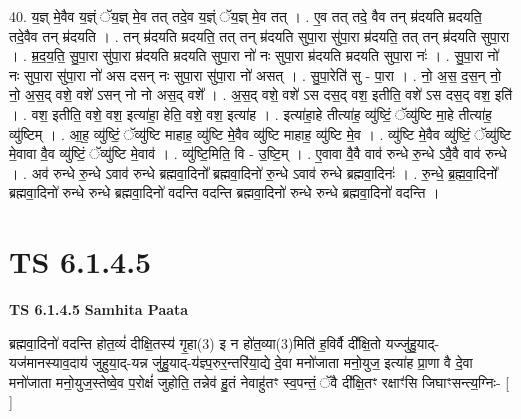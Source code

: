 \documentclass[17pt]{extarticle}
\begin{document}
40. य॒ज्ञ् मे॒वैव य॒ज्ञ्ं ॅय॒ज्ञ् मे॒व तत् तदे॒व य॒ज्ञ्ं ॅय॒ज्ञ् मे॒व तत् । . ए॒व तत् तदे॒ वैव तन् म्र॑दयति म्रदयति॒ तदे॒वैव तन् म्र॑दयति । . तन् म्र॑दयति म्रदयति॒ तत् तन् म्र॑दयति सुपा॒रा सु॑पा॒रा म्र॑दयति॒ तत् तन् म्र॑दयति सुपा॒रा । . म्र॒द॒य॒ति॒ सु॒पा॒रा सु॑पा॒रा म्र॑दयति म्रदयति सुपा॒रा नो॑ नः सुपा॒रा म्र॑दयति म्रदयति सुपा॒रा नः॑ । . सु॒पा॒रा नो॑ नः सुपा॒रा सु॑पा॒रा नो॑ अस दसन् नः सुपा॒रा सु॑पा॒रा नो॑ असत् । . सु॒पा॒रेति॑ सु - पा॒रा । . नो॒ अ॒स॒ द॒स॒न् नो॒ नो॒ अ॒स॒द् वशे॒ वशे॑ ऽसन् नो नो अस॒द् वशे᳚ । . अ॒स॒द् वशे॒ वशे॑ ऽस दस॒द् वश॒ इतीति॒ वशे॑ ऽस दस॒द् वश॒ इति॑ । . वश॒ इतीति॒ वशे॒ वश॒ इत्या॑हा॒ हेति॒ वशे॒ वश॒ इत्या॑ह । . इत्या॑हा॒हे तीत्या॑ह॒ व्यु॑ष्टिं॒ ॅव्यु॑ष्टि मा॒हे तीत्या॑ह॒ व्यु॑ष्टिम् । . आ॒ह॒ व्यु॑ष्टिं॒ ॅव्यु॑ष्टि माहाह॒ व्यु॑ष्टि मे॒वैव व्यु॑ष्टि माहाह॒ व्यु॑ष्टि मे॒व । . व्यु॑ष्टि मे॒वैव व्यु॑ष्टिं॒ ॅव्यु॑ष्टि मे॒वावा वै॒व व्यु॑ष्टिं॒ ॅव्यु॑ष्टि मे॒वाव॑ । . व्यु॑ष्टि॒मिति॒ वि - उ॒ष्टि॒म् । . ए॒वावा वै॒वै वाव॑ रुन्धे रु॒न्धे ऽवै॒वै वाव॑ रुन्धे । . अव॑ रुन्धे रु॒न्धे ऽवाव॑ रुन्धे ब्रह्मवा॒दिनो᳚ ब्रह्मवा॒दिनो॑ रु॒न्धे ऽवाव॑ रुन्धे ब्रह्मवा॒दिनः॑ । . रु॒न्धे॒ ब्र॒ह्म॒वा॒दिनो᳚ ब्रह्मवा॒दिनो॑ रुन्धे रुन्धे ब्रह्मवा॒दिनो॑ वदन्ति वदन्ति ब्रह्मवा॒दिनो॑ रुन्धे रुन्धे ब्रह्मवा॒दिनो॑ वदन्ति । \newline
\pagebreak
{}

\section{ TS 6.1.4.5 }

\textbf{TS 6.1.4.5 } \newline
\textbf{Samhita Paata} \newline

ब्रह्मवा॒दिनो॑ वदन्ति होत॒व्यं॑ दीक्षि॒तस्य॑ गृ॒हा(3) इ न हो॑त॒व्या(3)मिति॑ ह॒विर्वै दी᳚क्षि॒तो यज्जु॑हु॒याद्-यज॑मानस्याव॒दाय॑ जुहुया॒द्-यन्न जु॑हु॒याद्-य॑ज्ञ्प॒रुर॒न्तरि॑या॒द्ये दे॒वा मनो॑जाता मनो॒युज॒ इत्या॑ह प्रा॒णा वै दे॒वा मनो॑जाता मनो॒युज॒स्तेष्वे॒व प॒रोक्षं॑ जुहोति॒ तन्नेव॑ हु॒तं नेवाहु॑तꣳ स्व॒पन्तं॒ ॅवै दी᳚क्षि॒तꣳ रक्षाꣳ॑सि जिघाꣳसन्त्य॒ग्निः- [  ] \newline
\end{document}
